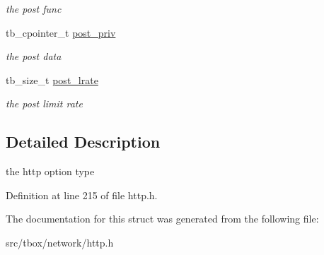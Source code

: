 \begin{DoxyCompactItemize}
\begin{DoxyCompactList}\small\item\em the post func \end{DoxyCompactList}\item 
\hypertarget{structtb__http__option__t_a1c2a26b642adecfbf32de28233024700}{tb\-\_\-cpointer\-\_\-t \hyperlink{structtb__http__option__t_a1c2a26b642adecfbf32de28233024700}{post\-\_\-priv}}\label{structtb__http__option__t_a1c2a26b642adecfbf32de28233024700}

\begin{DoxyCompactList}\small\item\em the post data \end{DoxyCompactList}\item 
\hypertarget{structtb__http__option__t_aba280928e712e58550960f0c88271a18}{tb\-\_\-size\-\_\-t \hyperlink{structtb__http__option__t_aba280928e712e58550960f0c88271a18}{post\-\_\-lrate}}\label{structtb__http__option__t_aba280928e712e58550960f0c88271a18}

\begin{DoxyCompactList}\small\item\em the post limit rate \end{DoxyCompactList}\end{DoxyCompactItemize}


\subsection{Detailed Description}
the http option type 

Definition at line 215 of file http.\-h.



The documentation for this struct was generated from the following file\-:\begin{DoxyCompactItemize}
\item 
src/tbox/network/http.\-h\end{DoxyCompactItemize}
